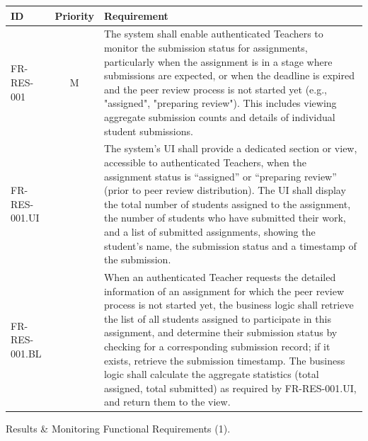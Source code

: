 \begin{longtable}{|l|c|p{10cm}|}
    \hline
    \textbf{ID} & \textbf{Priority} & \textbf{Requirement} \\
    \endhead %
    \hline
    FR-RES-001 & M & The system shall enable authenticated Teachers to monitor the submission status for assignments, particularly when the assignment is in a stage where submissions are expected, or when the deadline is expired and the peer review process is not started yet (e.g., "assigned", "preparing review"). This includes viewing aggregate submission counts and details of individual student submissions. \\
    \quad FR-RES-001.UI &  & \quad The system's UI shall provide a dedicated section or view, accessible to authenticated Teachers, when the assignment status is “assigned” or “preparing review” (prior to peer review distribution). The UI shall display the total number of students assigned to the assignment, the number of students who have submitted their work, and a list of submitted assignments, showing the student’s name, the submission status and a timestamp of the submission. \\
    \quad FR-RES-001.BL &  & \quad When an authenticated Teacher requests the detailed information of an assignment for which the peer review process is not started yet, the business logic shall retrieve the list of all students assigned to participate in this assignment, and determine their submission status by checking for a corresponding submission record; if it exists, retrieve the submission timestamp. The business logic shall calculate the aggregate statistics (total assigned, total submitted) as required by FR-RES-001.UI, and return them to the view. \\
    \hline
\end{longtable}

\begin{table}[h]
    \centering
    \caption{Results \& Monitoring Functional Requirements (1).}
    \label{tab:ResultMonitoringFR1}
\end{table}

\clearpage
\vspace*{1cm}

